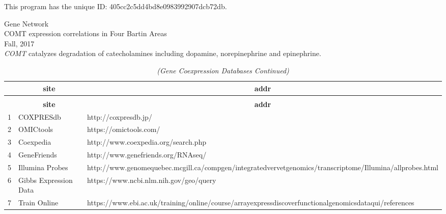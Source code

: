\documentclass[11pt]{article}
\begin{document}

 

This program has the unique ID: 405cc2c5dd4bd8e0983992907dcb72db.

\hspace{-1.5em}Gene Network\\
COMT expression correlations in Four Bartin Areas\\
Fall, 2017\\






{\textit {COMT}} catalyzes degradation of catecholamines including dopamine, norepinephrine and epinephrine.\\ 
\setlongtables\begin{longtable}{lll}\caption{Gene Coexpression Databases} \tabularnewline
\toprule
\multicolumn{1}{l}{\bfseries }&\multicolumn{1}{c}{\bfseries site}&\multicolumn{1}{c}{\bfseries addr}\tabularnewline
\midrule
\endfirsthead\caption[]{\em (Gene Coexpression Databases Continued)} \tabularnewline
\midrule
\multicolumn{1}{l}{\bfseries }&\multicolumn{1}{c}{\bfseries site}&\multicolumn{1}{c}{\bfseries addr}\tabularnewline
\midrule
\endhead
\midrule
\endfoot
\label{tabcoexpressurls}
1&COXPRESdb&http://coxpresdb.jp/\tabularnewline
2&OMICtools&https://omictools.com/\tabularnewline
3&Coexpedia&http://www.coexpedia.org/search.php\tabularnewline
4&GeneFriends&http://www.genefriends.org/RNAseq/\tabularnewline
5&Illumina Probes&http://www.genomequebec.mcgill.ca/compgen/integratedvervetgenomics/transcriptome/Illumina/allprobes.html\tabularnewline
6&Gibbs Expression Data&https://www.ncbi.nlm.nih.gov/geo/query\tabularnewline
7&Train Online&https://www.ebi.ac.uk/training/online/course/arrayexpressdiscoverfunctionalgenomicsdataqui/references\tabularnewline
\bottomrule
\end{longtable}
\end{document}
